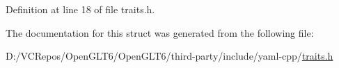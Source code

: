 Definition at line 18 of file traits.\+h.



The documentation for this struct was generated from the following file\+:\begin{DoxyCompactItemize}
\item 
D\+:/\+V\+C\+Repos/\+Open\+G\+L\+T6/\+Open\+G\+L\+T6/third-\/party/include/yaml-\/cpp/\mbox{\hyperlink{traits_8h}{traits.\+h}}\end{DoxyCompactItemize}
